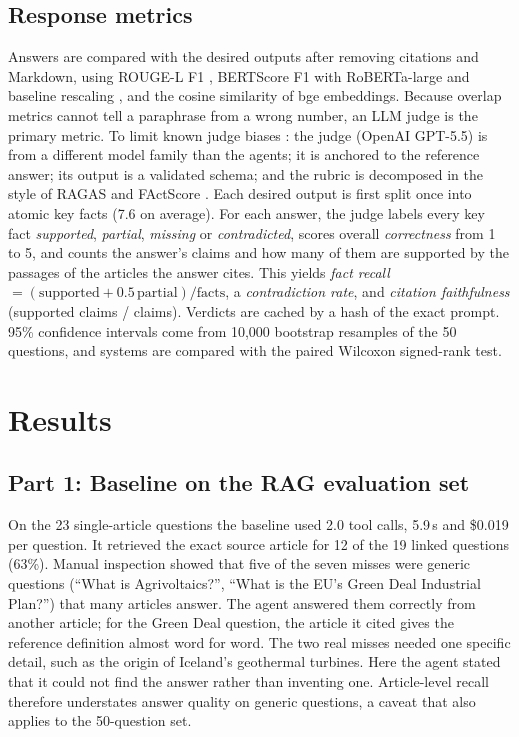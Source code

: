 \documentclass[conference]{IEEEtran}
\begin{document}
\subsection{Response metrics}
Answers are compared with the desired outputs after removing citations and Markdown, using ROUGE-L F1
\cite{lin2004rouge}, BERTScore F1 with RoBERTa-large and baseline rescaling \cite{zhang2020bertscore}, and the
cosine similarity of bge embeddings. Because overlap metrics cannot tell a paraphrase from a wrong number,
an LLM judge is the primary metric. To limit known judge biases \cite{zheng2023judge}: the judge (OpenAI
GPT-5.5) is from a different model family than the agents; it is anchored to the reference answer; its
output is a validated schema; and the rubric is decomposed in the style of RAGAS and FActScore
\cite{es2024ragas, min2023factscore}. Each desired output is first split once into atomic key facts
(7.6 on average). For each answer, the judge labels every key fact \emph{supported}, \emph{partial},
\emph{missing} or \emph{contradicted}, scores overall \emph{correctness} from 1 to 5, and counts the answer's
claims and how many of them are supported by the passages of the articles the answer cites. This yields
\emph{fact recall} $=(\text{supported}+0.5\,\text{partial})/\text{facts}$, a \emph{contradiction rate},
and \emph{citation faithfulness} (supported claims / claims). Verdicts are cached by a hash of the exact
prompt. 95\% confidence intervals come from 10{,}000 bootstrap resamples of the 50 questions, and systems
are compared with the paired Wilcoxon signed-rank test.

\section{Results}

\subsection{Part 1: Baseline on the RAG evaluation set}
On the 23 single-article questions the baseline used 2.0 tool calls, 5.9\,s and \$0.019 per question. It
retrieved the exact source article for 12 of the 19 linked questions (63\%). Manual inspection showed that
five of the seven misses were generic questions (``What is Agrivoltaics?'', ``What is the EU's Green Deal
Industrial Plan?'') that many articles answer. The agent answered them correctly from another article; for the
Green Deal question, the article it cited gives the reference definition almost word for word. The two real misses
needed one specific detail, such as the origin of Iceland's geothermal turbines. Here the agent stated that it could
not find the answer rather than inventing one. Article-level recall therefore understates answer quality on
generic questions, a caveat that also applies to the 50-question set.
\end{document}
